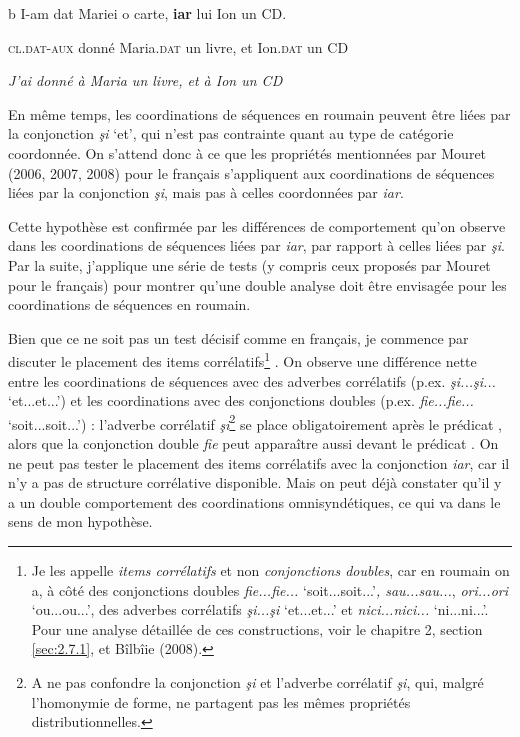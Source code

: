   b  I-am dat Mariei o carte, \textbf{iar} lui Ion un CD.

    \textsc{cl.dat-aux} donné Maria.\textsc{dat} un livre, et Ion.\textsc{dat} un CD

{\itshape
J'ai donné à Maria un livre, et à Ion un CD}

En même temps, les coordinations de séquences en roumain peuvent être liées par la conjonction \textit{şi} `et', qui n'est pas contrainte quant au type de catégorie coordonnée. On s'attend donc à ce que les propriétés mentionnées par Mouret (2006, 2007, 2008) pour le français s'appliquent aux coordinations de séquences liées par la conjonction \textit{şi}, mais pas à celles coordonnées par \textit{iar}.

Cette hypothèse est confirmée par les différences de comportement qu'on observe dans les coordinations de séquences liées par \textit{iar}, par rapport à celles liées par \textit{şi}. Par la suite, j'applique une série de tests (y compris ceux proposés par Mouret pour le français) pour montrer qu'une double analyse doit être envisagée pour les coordinations de séquences en roumain.

Bien que ce ne soit pas un test décisif comme en français, je commence par discuter le placement des items corrélatifs\footnote{Je les appelle \textit{items corrélatifs} et non \textit{conjonctions doubles}, car en roumain on a, à côté des conjonctions doubles \textit{fie...fie...} `soit...soit...'\textit{, sau...sau...}, \textit{ori...ori} `ou...ou...', des adverbes corrélatifs \textit{şi...şi} `et...et...' et \textit{nici...nici...} `ni...ni...'. Pour une analyse détaillée de ces constructions, voir le chapitre 2, section \ref{sec:2.7.1}, et Bîlbîie (2008).} . On observe une différence nette entre les coordinations de séquences avec des adverbes corrélatifs (p.ex. \textit{şi...şi...} `et...et...') et les coordinations avec des conjonctions doubles (p.ex. \textit{fie...fie...} `soit...soit...') : l'adverbe corrélatif \textit{şi}\footnote{A ne pas confondre la conjonction \textit{şi} et l'adverbe corrélatif \textit{şi}, qui, malgré l'homonymie de forme, ne partagent pas les mêmes propriétés distributionnelles.} se place obligatoirement après le prédicat , alors que la conjonction double \textit{fie} peut apparaître aussi devant le prédicat . On ne peut pas tester le placement des items corrélatifs avec la conjonction \textit{iar}, car il n'y a pas de structure corrélative disponible. Mais on peut déjà constater qu'il y a un double comportement des coordinations omnisyndétiques, ce qui va dans le sens de mon hypothèse.



